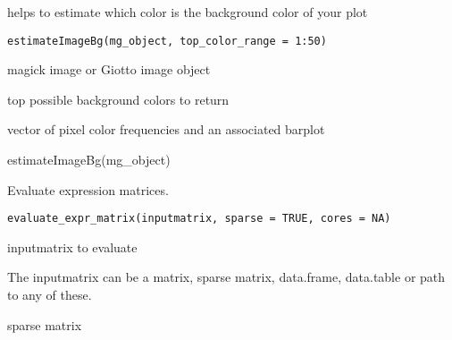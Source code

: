 \documentclass[a4paper]{book}
\begin{document}
%
\begin{Description}\relax
helps to estimate which color is the background color of your plot
\end{Description}
%
\begin{Usage}
\begin{verbatim}
estimateImageBg(mg_object, top_color_range = 1:50)
\end{verbatim}
\end{Usage}
%
\begin{Arguments}
\begin{ldescription}
\item[\code{mg\_object}] magick image or Giotto image object

\item[\code{top\_color\_range}] top possible background colors to return
\end{ldescription}
\end{Arguments}
%
\begin{Value}
vector of pixel color frequencies and an associated barplot
\end{Value}
%
\begin{Examples}
\begin{ExampleCode}
    estimateImageBg(mg_object)
\end{ExampleCode}
\end{Examples}
%
\begin{Description}\relax
Evaluate expression matrices.
\end{Description}
%
\begin{Usage}
\begin{verbatim}
evaluate_expr_matrix(inputmatrix, sparse = TRUE, cores = NA)
\end{verbatim}
\end{Usage}
%
\begin{Arguments}
\begin{ldescription}
\item[\code{inputmatrix}] inputmatrix to evaluate
\end{ldescription}
\end{Arguments}
%
\begin{Details}\relax
The inputmatrix can be a matrix, sparse matrix, data.frame, data.table or path to any of these.
\end{Details}
%
\begin{Value}
sparse matrix
\end{Value}
\end{document}
